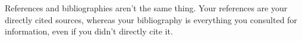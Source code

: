 \documentclass[12pt]{report}
\begin{document}
    References and bibliographies aren't the same thing. Your references 
    are your directly cited sources, whereas your bibliography is everything you 
    consulted for information, even if you didn't directly cite it. \\

    \printbibliography[keyword={refs}, title = {References}]

    \nocite{IBMAIDef}
    \nocite{ICOAIDef}
    \nocite{IBMGenAI}
    \nocite{MITGenAI}
    \nocite{CloudflareLLM}

    \printbibliography[keyword={bib}] %
\end{document}
